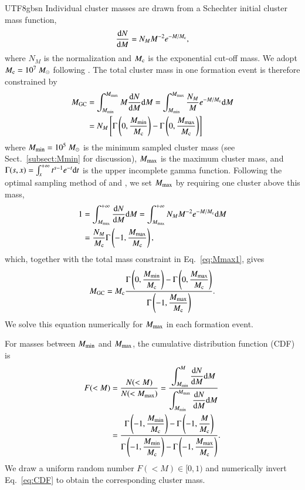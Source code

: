 \documentclass[trackchanges, twocolappendix, twocolumn]{aastex701}
\begin{document}
\begin{CJK*}{UTF8}{gbsn}
Individual cluster masses are drawn from a Schechter initial cluster mass function,
\begin{align}
\dfrac{{\rm d} N}{{\rm d} M} = N_M M^{-2} e^{-M / M_{\rm c}} ,
\label{eq:ICMF}
\end{align}
where $N_M$ is the normalization and $M_{\rm c}$ is the exponential cut-off mass. We adopt $M_{\rm c} = 10^7~M_\odot$ following \cite{Choksi&Gnedin2019aGC}. The total cluster mass in one formation event is therefore constrained by
\begin{align}
M_{\rm GC} & = \int_{M_{\rm min}}^{M_{\rm max}} M \dfrac{{\rm d} N}{{\rm d} M} {\rm d} M = \int_{M_{\rm min}}^{M_{\rm max}} \dfrac{N_M}{M} e^{-M / M_{\rm c}} {\rm d} M \notag \\
& = N_M \left[ \Gamma \left( 0, \dfrac{M_{\rm min}}{M_{\rm c}} \right) - \Gamma \left( 0, \dfrac{M_{\rm max}}{M_{\rm c}} \right) \right]
\label{eq:Mmax1}
\end{align}
where $M_{\rm min} = 10^5~M_\odot$ is the minimum sampled cluster mass (see Sect.~\ref{subsect:Mmin} for discussion), $M_{\rm max}$ is the maximum cluster mass, and $\Gamma (s, x) = \int_x^{+ \infty} t^{s - 1} e^{- t} {\rm d} t$ is the upper incomplete gamma function. Following the optimal sampling method of \cite{Schulz+2015CMF} and \cite{Choksi&Gnedin2019aGC}, we set $M_{\rm max}$ by requiring one cluster above this mass,
\begin{align}
1 & = \int_{M_{\rm max}}^{+ \infty} \dfrac{{\rm d} N}{{\rm d} M} {\rm d} M = \int_{M_{\rm max}}^{+ \infty} N_M M^{-2} e^{-M / M_{\rm c}} {\rm d} M \notag \\
& = \dfrac{N_M}{M_{\rm c}} \Gamma \left( - 1, \dfrac{M_{\max}}{M_{\rm c}} \right) ,
\label{eq:Mmax2}
\end{align}
which, together with the total mass constraint in Eq.~\ref{eq:Mmax1}, gives
\begin{align}
M_{\rm GC} = M_{\rm c} \dfrac{\Gamma \left( 0, \dfrac{M_{\rm min}}{M_{\rm c}} \right) - \Gamma \left( 0, \dfrac{M_{\rm max}}{M_{\rm c}} \right)}{\Gamma \left( - 1, \dfrac{M_{\max}}{M_{\rm c}} \right)} .
\label{eq:Mmax}
\end{align}
We solve this equation numerically for $M_{\rm max}$ in each formation event.

For masses between $M_{\rm min}$ and $M_{\rm max}$, the cumulative distribution function (CDF) is
\begin{align}
F (< M) & = \dfrac{N (< M)}{N (< M_{\rm max})} = \dfrac{\displaystyle \int_{M_{\rm min}}^M \dfrac{{\rm d} N}{{\rm d} M} {\rm d} M}{\displaystyle \int_{M_{\rm min}}^{M_{\rm max}} \dfrac{{\rm d} N}{{\rm d} M} {\rm d} M} \notag \\
& = \dfrac{ \Gamma \left( - 1, \dfrac{M_{\rm min}}{M_{\rm c}} \right) - \Gamma \left( - 1, \dfrac{M}{M_{\rm c}} \right)}{\Gamma \left( - 1, \dfrac{M_{\rm min}}{M_{\rm c}} \right) - \Gamma \left( - 1, \dfrac{M_{\rm max}}{M_{\rm c}} \right)} .
\label{eq:CDF}
\end{align}
We draw a uniform random number $F (< M) \in [0, 1)$ and numerically invert Eq.~\ref{eq:CDF} to obtain the corresponding cluster mass.


\end{CJK*}
\end{document}
